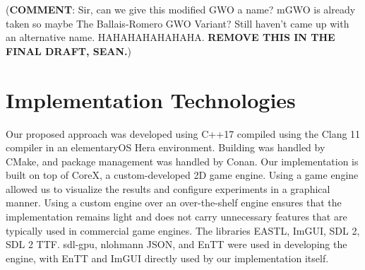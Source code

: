 (\textbf{COMMENT}: Sir, can we give this modified GWO a name? mGWO is already taken so maybe The Ballais-Romero GWO Variant? Still haven't came up with an alternative name. HAHAHAHAHAHAHA. \textbf{REMOVE THIS IN THE FINAL DRAFT, SEAN.})

\section{Implementation Technologies}
Our proposed approach was developed using C++17 compiled using the Clang 11 compiler in an elementaryOS Hera environment. Building was handled by CMake, and package management was handled by Conan. Our implementation is built on top of CoreX, a custom-developed 2D game engine. Using a game engine allowed us to visualize the results and configure experiments in a graphical manner. Using a custom engine over an over-the-shelf engine ensures that the implementation remains light and does not carry unnecessary features that are typically used in commercial game engines. The libraries EASTL, ImGUI, SDL 2, SDL 2 TTF. sdl-gpu, nlohmann JSON, and EnTT were used in developing the engine, with EnTT and ImGUI directly used by our implementation itself.
